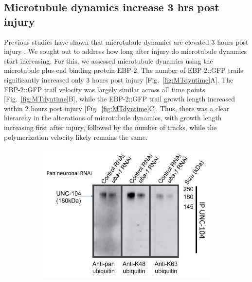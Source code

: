 \begin{appendices}
	\subsection{Microtubule dynamics increase 3 hrs post injury}
	
	Previous studies have shown that microtubule dynamics are elevated 3 hours post injury \parencite{ghosh-roy2012}. We sought out to address how long after injury do microtubule dynamics start increasing. For this, we assessed microtubule dynamics using the microtubule plus-end binding protein EBP-2. The number of EBP-2::GFP trails significantly increased only 3 hours post injury [Fig.~\ref{fig:MTdyntime}A]. The EBP-2::GFP trail velocity was largely similar across all time points [Fig.~\ref{fig:MTdyntime}B], while the EBP-2::GFP trail growth length increased within 2 hours post injury [Fig.~\ref{fig:MTdyntime}C]. Thus, there was a clear hierarchy in the alterations of microtubule dynamics, with growth length increasing first after injury, followed by the number of tracks, while the polymerization velocity likely remains the same.
		

	

	
		\begin{figure}[H]
		\centering
		\begin{subfigure}{0.3\textwidth}
			\caption{}
			\includegraphics[width=\textwidth]{figs/example}
			

\end{subfigure}
\end{figure}
\end{appendices}
